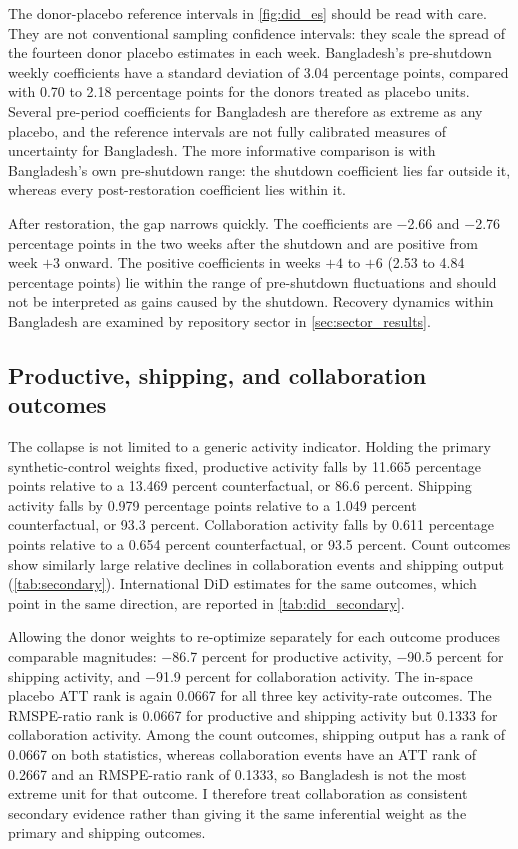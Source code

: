 The donor-placebo reference intervals in \cref{fig:did_es} should be read with care. They are not conventional sampling confidence intervals: they scale the spread of the fourteen donor placebo estimates in each week. Bangladesh's pre-shutdown weekly coefficients have a standard deviation of 3.04 percentage points, compared with 0.70 to 2.18 percentage points for the donors treated as placebo units. Several pre-period coefficients for Bangladesh are therefore as extreme as any placebo, and the reference intervals are not fully calibrated measures of uncertainty for Bangladesh. The more informative comparison is with Bangladesh's own pre-shutdown range: the shutdown coefficient lies far outside it, whereas every post-restoration coefficient lies within it.

After restoration, the gap narrows quickly. The coefficients are $-$2.66 and $-$2.76 percentage points in the two weeks after the shutdown and are positive from week $+3$ onward. The positive coefficients in weeks $+4$ to $+6$ (2.53 to 4.84 percentage points) lie within the range of pre-shutdown fluctuations and should not be interpreted as gains caused by the shutdown. Recovery dynamics within Bangladesh are examined by repository sector in \cref{sec:sector_results}.

\subsection{Productive, shipping, and collaboration outcomes}
\label{sec:secondary}

The collapse is not limited to a generic activity indicator. Holding the primary synthetic-control weights fixed, productive activity falls by 11.665 percentage points relative to a 13.469 percent counterfactual, or 86.6 percent. Shipping activity falls by 0.979 percentage points relative to a 1.049 percent counterfactual, or 93.3 percent. Collaboration activity falls by 0.611 percentage points relative to a 0.654 percent counterfactual, or 93.5 percent. Count outcomes show similarly large relative declines in collaboration events and shipping output (\cref{tab:secondary}). International DiD estimates for the same outcomes, which point in the same direction, are reported in \cref{tab:did_secondary}.

Allowing the donor weights to re-optimize separately for each outcome produces comparable magnitudes: $-$86.7 percent for productive activity, $-$90.5 percent for shipping activity, and $-$91.9 percent for collaboration activity. The in-space placebo ATT rank is again 0.0667 for all three key activity-rate outcomes. The RMSPE-ratio rank is 0.0667 for productive and shipping activity but 0.1333 for collaboration activity. Among the count outcomes, shipping output has a rank of 0.0667 on both statistics, whereas collaboration events have an ATT rank of 0.2667 and an RMSPE-ratio rank of 0.1333, so Bangladesh is not the most extreme unit for that outcome. I therefore treat collaboration as consistent secondary evidence rather than giving it the same inferential weight as the primary and shipping outcomes.





